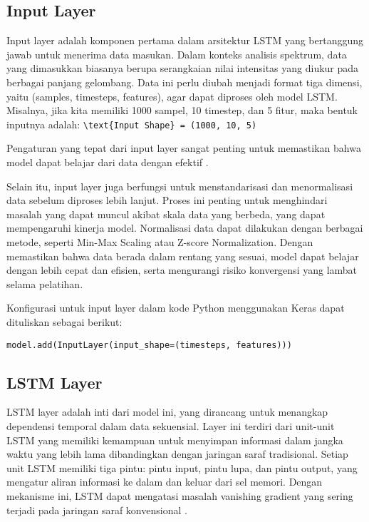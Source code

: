 \subsection{Input Layer}
\par Input layer adalah komponen pertama dalam arsitektur LSTM yang bertanggung jawab untuk menerima data masukan. Dalam konteks analisis spektrum, data yang dimasukkan biasanya berupa serangkaian nilai intensitas yang diukur pada berbagai panjang gelombang. Data ini perlu diubah menjadi format tiga dimensi, yaitu (samples, timesteps, features), agar dapat diproses oleh model LSTM. Misalnya, jika kita memiliki 1000 sampel, 10 timestep, dan 5 fitur, maka bentuk inputnya adalah:
\lstinline[]|\text{Input Shape} = (1000, 10, 5)|

Pengaturan yang tepat dari input layer sangat penting untuk memastikan bahwa model dapat belajar dari data dengan efektif \parencite{hochreiter1997}.

\par Selain itu, input layer juga berfungsi untuk menstandarisasi dan menormalisasi data sebelum diproses lebih lanjut. Proses ini penting untuk menghindari masalah yang dapat muncul akibat skala data yang berbeda, yang dapat mempengaruhi kinerja model. Normalisasi data dapat dilakukan dengan berbagai metode, seperti Min-Max Scaling atau Z-score Normalization. Dengan memastikan bahwa data berada dalam rentang yang sesuai, model dapat belajar dengan lebih cepat dan efisien, serta mengurangi risiko konvergensi yang lambat selama pelatihan.

\par Konfigurasi untuk input layer dalam kode Python menggunakan Keras dapat dituliskan sebagai berikut:
    
\lstinline[]|model.add(InputLayer(input_shape=(timesteps, features)))|
  

\subsection{LSTM Layer}
\par LSTM layer adalah inti dari model ini, yang dirancang untuk menangkap dependensi temporal dalam data sekuensial. Layer ini terdiri dari unit-unit LSTM yang memiliki kemampuan untuk menyimpan informasi dalam jangka waktu yang lebih lama dibandingkan dengan jaringan saraf tradisional. Setiap unit LSTM memiliki tiga pintu: pintu input, pintu lupa, dan pintu output, yang mengatur aliran informasi ke dalam dan keluar dari sel memori. Dengan mekanisme ini, LSTM dapat mengatasi masalah vanishing gradient yang sering terjadi pada jaringan saraf konvensional \parencite{graves2013}.

